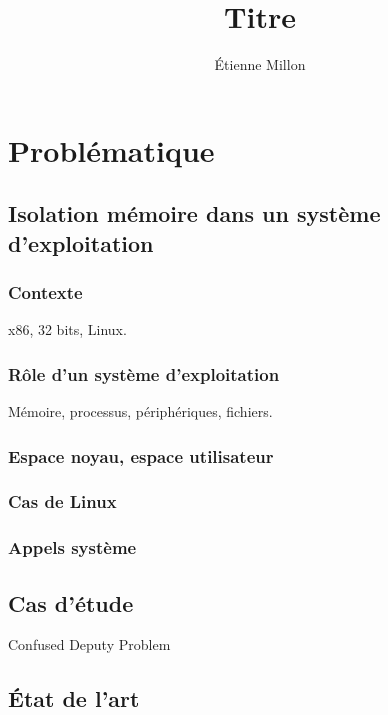 \documentclass{phdthesis}
\title{Titre}
\author{Étienne Millon}
\begin{document}

\tableofcontents


\part{Problématique}

\chapter{Isolation mémoire dans un système d'exploitation}

\section{Contexte}

x86, 32 bits, Linux.

\cite{UnderstandingTheLinuxKernel}

\section{Rôle d'un système d'exploitation}

\cite{tanenbaum} Mémoire, processus, périphériques, fichiers.

\section{Espace noyau, espace utilisateur}

\section{Cas de Linux}

\section{Appels système}

\chapter{Cas d'étude}

Confused Deputy Problem
\cite{hardy88confused}

\chapter{État de l'art}
\end{document}
